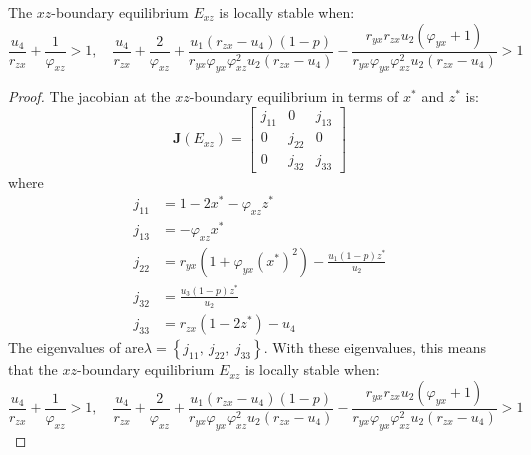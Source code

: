\begin{theorem}\label{thm:boundary-xz-stability}
    The $xz$-boundary equilibrium $E_{xz}$ is locally stable when:
    \begin{equation*}
        \frac{u_4}{r_{zx}}+\frac{1}{\varphi_{xz}} > 1,\quad
        \frac{u_4}{r_{zx}}+\frac{2}{\varphi_{xz}}+\frac{u_1\left(r_{zx}-u_4\right)\left(1-p\right)}{r_{yx}\varphi_{yx}\varphi_{xz}^2u_2\left(r_{zx}-u_4\right)}-\frac{r_{yx}r_{zx}u_2\left(\varphi_{yx}+1\right)}{r_{yx}\varphi_{yx}\varphi_{xz}^2u_2\left(r_{zx}-u_4\right)} > 1
    \end{equation*}
\end{theorem}
\begin{proof}
    The jacobian at the $xz$-boundary equilibrium in terms of $x^*$ and $z^*$ is:
    \begin{equation}\label{matrix:jacobian-boundary-xz}
        \textbf{J}\left(E_{xz}\right) = \begin{bmatrix}
            j_{11} & 0 & j_{13}\\
            0 & j_{22} & 0\\
            0 & j_{32} & j_{33}
        \end{bmatrix}
    \end{equation}
    where
    \begin{align*}
        j_{11} &= 1-2x^*-\varphi_{xz}z^*\\
        j_{13} &= -\varphi_{xz}x^*\\
        j_{22} &= r_{yx}\left(1+\varphi_{yx}\left(x^*\right)^2\right)-\frac{u_1\left(1-p\right)z^*}{u_2}\\
        j_{32} &= \frac{u_3\left(1-p\right)z^*}{u_2}\\
        j_{33} &= r_{zx}\left(1-2z^*\right)-u_4
    \end{align*}
    The eigenvalues of  are$\lambda=\left\{j_{11},\ j_{22},\ j_{33}\right\}$. With these eigenvalues, this means that the $xz$-boundary equilibrium $E_{xz}$ is locally stable when:
    \begin{equation*}
        \frac{u_4}{r_{zx}}+\frac{1}{\varphi_{xz}} > 1,\quad
        \frac{u_4}{r_{zx}}+\frac{2}{\varphi_{xz}}+\frac{u_1\left(r_{zx}-u_4\right)\left(1-p\right)}{r_{yx}\varphi_{yx}\varphi_{xz}^2u_2\left(r_{zx}-u_4\right)}-\frac{r_{yx}r_{zx}u_2\left(\varphi_{yx}+1\right)}{r_{yx}\varphi_{yx}\varphi_{xz}^2u_2\left(r_{zx}-u_4\right)} > 1
    \end{equation*}
\end{proof}

